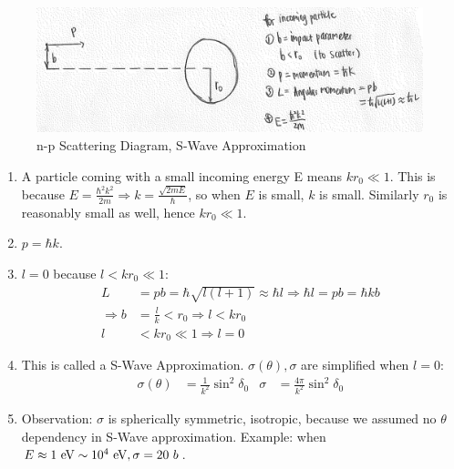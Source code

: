 \documentclass{school-22.101-notes}
\begin{document}
\begin{figure}[ht]
    \centering
    \includegraphics[width=6in]{images/scattering/np-scattering-diagram.png}
    \caption{n-p Scattering Diagram, S-Wave Approximation}
\end{figure}
\begin{enumerate}
\item A particle coming with a small incoming energy E means $k r_0 \ll 1$. This is because $E = \frac{\hbar^2 k^2}{2m} \Rightarrow k = \frac{\sqrt{2mE}}{\hbar}$, so when $E$ is small, $k$ is small. Similarly $r_0$ is reasonably small as well, hence $k r_0 \ll 1$. 

\item $ p = \hbar k$. 

\item $l=0$ because $l<kr_0 \ll 1$:
\begin{align}
L &= pb = \hbar \sqrt{l (l+1)} \approx \hbar l \Rightarrow \hbar l = pb = \hbar k b \\
\Rightarrow b &= \frac{l}{k} < r_0 \Rightarrow l < kr_0 \\
l &< k r_0 \ll 1 \Rightarrow l = 0
\end{align}

\item This is called a S-Wave Approximation. $\sigma (\theta), \sigma$ are simplified when $l=0$:
\begin{align}
\sigma (\theta) &= \frac{1}{k^2} \sin^2 \delta_0 & \sigma &= \boxed{ \frac{4 \pi}{k^2} \sin^2 \delta_0 } \label{sigma}
\end{align}

\item Observation: $\sigma$ is spherically symmetric, isotropic, because we assumed no $\theta$ dependency in S-Wave approximation. Example: when $E \approx 1 \mbox{ } \mathrm{eV} \sim 10^4 \mbox{ } \mathrm{eV}, \sigma = 20 \mbox{ } b$. 


\end{enumerate}
\end{document}
